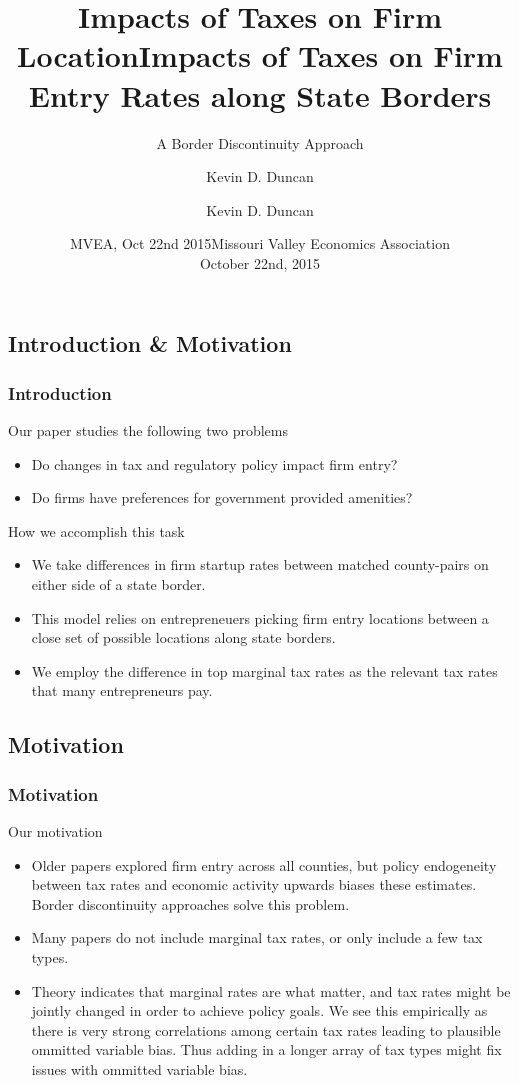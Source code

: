 \documentclass{beamer}
\title{Impacts of Taxes on Firm Location}
\author{Kevin D. Duncan}
\institute{Iowa State University}
\date{MVEA, Oct 22nd 2015}
\begin{document}
\begin{frame}
\title{Impacts of Taxes on Firm Entry Rates along State Borders}
\subtitle{A Border Discontinuity Approach}
\author{Kevin D. Duncan}
\date{Missouri Valley Economics Association \\ October 22nd, 2015}
\maketitle
\end{frame}

\begin{frame}
\section{Introduction \& Motivation}
\frametitle{Introduction}
Our paper studies the following two problems
\begin{itemize}
\item Do changes in tax and regulatory policy impact firm entry?
\item Do firms have preferences for government provided amenities?
\end{itemize}

How we accomplish this task
\begin{itemize}
\item We take differences in firm startup rates between matched county-pairs on either side of a state border.
\item This model relies on entrepreneuers picking firm entry locations between a close set of possible locations along state borders.
\item We employ the difference in top marginal tax rates as the relevant tax rates that many entrepreneurs pay.
\end{itemize}

\end{frame}


\begin{frame}
\section{Motivation}
\frametitle{Motivation}
Our motivation
\begin{itemize}
\item Older papers explored firm entry across all counties, but policy endogeneity between tax rates and economic activity upwards biases these estimates. Border discontinuity approaches solve this problem.
\item  Many papers do not include marginal tax rates, or only include a few tax types.
\item Theory indicates that marginal rates are what matter, and tax rates might be jointly changed in order to achieve policy goals. We see this empirically as there is very strong correlations among certain tax rates leading to plausible ommitted variable bias. Thus adding in a longer array of tax types might fix issues with ommitted variable bias.
\end{itemize}
\end{frame}
\end{document}
